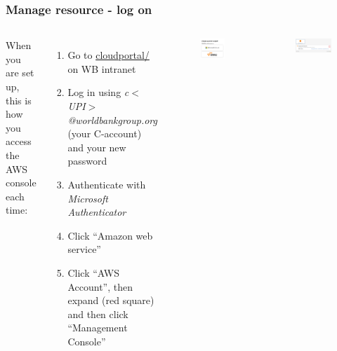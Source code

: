 \documentclass[aspectratio=169]{beamer} %
\begin{document}
\begin{frame}
	\frametitle{Manage resource - log on}

	\begin{columns}[c]


		When you are set up, this is how you access the AWS console each time:

		\begin{enumerate}
			\item Go to \url{cloudportal/} on WB intranet
			\item Log in using \textit{c$<$UPI$>$@worldbankgroup.org}
			(your C-account) and your new password
			\item Authenticate with \textit{Microsoft Authenticator}
			\item Click ``Amazon web service''
			\item Click ``AWS Account'', then expand (red square) and then click ``Management Console''

		\end{enumerate}

		\begin{figure}
			\centering
			\includegraphics[width=.5\textwidth]{./img/logon-1.png}
		\end{figure}
		\vspace{.2cm}
		\begin{figure}
			\centering
			\includegraphics[width=1\textwidth]{./img/logon-2.png}
		\end{figure}
	\end{columns}
\end{frame}
\end{document}
